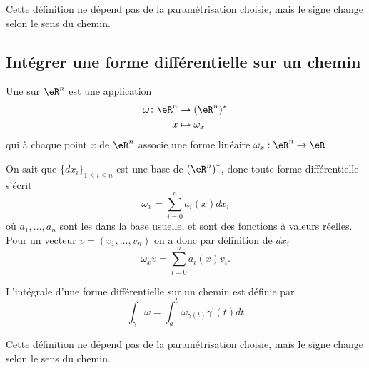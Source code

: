 \begin{remark}
  Cette définition ne dépend pas de la paramétrisation choisie, mais
  le signe change selon le sens du chemin.
\end{remark}

\subsection{Intégrer une forme différentielle sur un chemin}

Une  sur $\eR^n$ est une application
\begin{equation}
	\begin{aligned}
		\omega\colon \eR^n&\to (\eR^n)^* \\
		x&\mapsto \omega_x 
	\end{aligned}
\end{equation}
qui à chaque point $x$ de $\eR^n$ associe une forme linéaire $\omega_x: \eR^n \to \eR$.

On sait que $\{ d x_i \}_{1\leq i\leq n}$ est une base de
${(\eR^{n})}^{*}$, donc toute forme différentielle s'écrit
\begin{equation*}
  \omega_x = \sum_{i=0}^n a_i(x) d x_i
\end{equation*}
où $a_1,\ldots,a_n$ sont les  dans la
base usuelle, et sont des fonctions à valeurs réelles. Pour un vecteur
$v = (v_1,\ldots,v_n)$ on a donc par définition de $d x_i$
\begin{equation*}
  \omega_x v = \sum_{i=0}^n a_i(x) v_i.
\end{equation*}

L'intégrale d'une forme différentielle sur un chemin est définie par
\begin{equation}    \label{EqEFIZyEe}
    \int_\gamma \omega = \int_a^b \omega_{\gamma(t)}\gamma^\prime(t) d t
\end{equation}

\begin{remark}
  Cette définition ne dépend pas de la paramétrisation choisie, mais
  le signe change selon le sens du chemin.
\end{remark}


